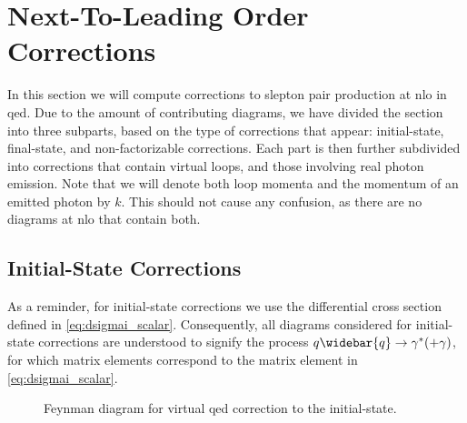 \section{Next-To-Leading Order Corrections}\label{sec:nlo}
In this section we will compute corrections to slepton pair production at \gls{nlo} in \gls{qed}.
Due to the amount of contributing diagrams, we have divided the section into three subparts, based on the type of corrections that appear: initial-state, final-state, and non-factorizable corrections.
Each part is then further subdivided into corrections that contain virtual loops, and those involving real photon emission. Note that we will denote both loop momenta and the momentum of an emitted photon by $k$. This should not cause any confusion, as there are no diagrams at \gls{nlo} that contain both.


\subsection{Initial-State Corrections}\label{sec:initial_state}

As a reminder, for initial-state corrections we use the differential cross section defined in \cref{eq:dsigmai_scalar}. Consequently, all diagrams considered for initial-state corrections are understood to signify the process $q\widebar{q} \to \gamma^*(+\gamma)$, for which matrix elements correspond to the matrix element in \cref{eq:dsigmai_scalar}.

\begin{figure}
    \centering
    \caption{Feynman diagram for virtual \acrshort{qed} correction to the initial-state.}
    \label{fig:is_virt}
\end{figure}

